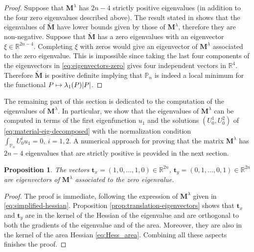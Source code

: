 \documentclass[JEP,XML,SOM,Unicode,ThmDefs,NoFloatCountersInSection,published]{cedram}
\def\mto{\mathchoice{\longmapsto}{\mapsto}{\mapsto}{\mapsto}}
\theoremstyle{plain}
\newtheorem{propo}[thm]{Proposition}
\theoremstyle{definition}
\newcommand{\bo}[1]{{\boldsymbol#1}}
\let\Bbb\mathbb
\def\Pp{{\mathbb{P}_n}}
\begin{document}
\begin{proof}
Suppose that $\bo M^\lambda$ has $2n-4$ strictly positive eigenvalues (in addition to the four zero eigenvalues described above). The result stated in \cite[Th.\,4.3.28]{horn-matrix} shows that the eigenvalues of $\widetilde{\bo{M}}$ have lower bounds given by those of $\bo M^\lambda$, therefore they are non-negative. Suppose that $\widetilde{\bo{M}}$ has a zero eigenvalues with an eigenvector $\xi\in \Bbb{R}^{2n-4}$. Completing $\xi$ with zeros would give an eigenvector of $\bo M^\lambda$ associated to the zero eigenvalue. This is impossible since taking the last four components of the eigenvectors in \eqref{eq:eigenvectors-zero} gives four independent vectors in $\Bbb{R}^4$. Therefore $\widetilde{\bo{M}}$ is positive definite implying that $\Pp$ is indeed a local minimum for the functional $P \mto \lambda_1(P)|P|$.
\end{proof}

The remaining part of this section is dedicated to the computation of the eigenvalues of $\bo M^\lambda$. In particular, we show that the eigenvalues of $\bo M^\lambda$ can be computed in terms of the first eigenfunction $u_1$ and the solutions $(U_0^1,U_0^2)$ of \eqref{eq:material-eig-decomposed} with the normalization condition $\int_{\Pp} U_0^i u_1 =0,\ i=1,2$. A numerical approach for proving that the matrix $\bo M^\lambda$ has $2n-4$ eigenvalues that are strictly positive is provided in the next section.

\begin{propo}
The vectors $\bo t_x = (1,0,\dots,1,0) \in \Bbb{R}^{2n}$, $\bo t_y = (0,1,\dots,0,1) \in \Bbb{R}^{2n}$ are eigenvectors of $\bo M^\lambda$ associated to the zero eigenvalue.
\label{prop:tx-ty}
\end{propo}

\begin{proof} The proof is immediate, following the expression of $\bo M^\lambda$ given in \eqref{eq:simplified-hessian}. Proposition \ref{prop:translation-eigenvectors} shows that $\bo t_x$ and $\bo t_y$ are in the kernel of the Hessian of the eigenvalue and are orthogonal to both the gradients of the eigenvalue and of the area. Moreover, they are also in the kernel of the area Hessian \eqref{eq:Hess_area}. Combining all these aspects finishes the proof.
\end{proof}
\end{document}
